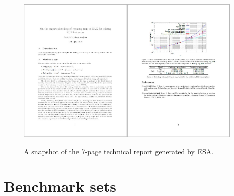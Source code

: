 \documentclass[aic]{iosart2x}
\begin{document}
\begin{figure}[t]
\begin{centering}
\includegraphics[width=0.48\textwidth]{ESA_output_1}\includegraphics[width=0.48\textwidth]{ESA_output_2}
\par\end{centering}

\caption{A snapshot of the 7-page technical report generated by ESA.}\label{fig:Snapshot-ESA-output}
\end{figure}


\section{Benchmark sets}
\label{sec:AA}
\end{document}
